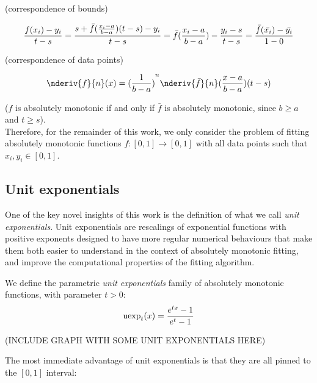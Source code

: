 \documentclass[12pt,a4paper]{article}
\newcommand{\uexp}[1] {{\text{uexp}_{#1}}}
\begin{document}
\noindent (correspondence of bounds)

\begin{equation}
{{f(x_i) - y_i } \over {t-s}} = {{s + \bar{f}({{x_i - a} \over {b-a}}) (t - s) - y_i} \over {t-s}} = \bar{f}({{x_i - a} \over {b-a}}) - {{y_i - s} \over {t-s}} = {{\bar{f}(\bar{x_i}) - \bar{y_i}} \over {1 - 0}}\\
\end{equation}

\noindent (correspondence of data points)

\begin{equation}
\nderiv{f}{n}(x) = {({{1} \over {b - a}})}^n {\nderiv{\bar{f}}{n}} ({{x -a} \over {b-a}}) (t-s)\\
\end{equation}

\noindent ($f$ is absolutely monotonic if and only if $\bar{f}$ is absolutely monotonic, since $b \geq a$ and $t \geq s$).\\

Therefore, for the remainder of this work, we only consider the problem of fitting absolutely monotonic functions $f: [0,1] \rightarrow [0,1]$ with all data points such that $x_i, y_i \in [0,1]$.

\subsection{Unit exponentials}

One of the key novel insights of this work is the definition of what we call {\emph{unit exponentials}}. Unit exponentials are rescalings of exponential functions with positive exponents designed to have more regular numerical behaviours that make them both easier to understand in the context of absolutely monotonic fitting, and improve the computational properties of the fitting algorithm.\\

\begin{definition}
We define the parametric {\emph{unit exponentials}} family of absolutely monotonic functions, with parameter $t > 0$:
\begin{equation}
\uexp{t}(x) = {{e^{tx} - 1} \over {e^t - 1}}
\end{equation}
\end{definition}

(INCLUDE GRAPH WITH SOME UNIT EXPONENTIALS HERE)

The most immediate advantage of unit exponentials is that they are all pinned to the $[0,1]$ interval:
\end{document}
